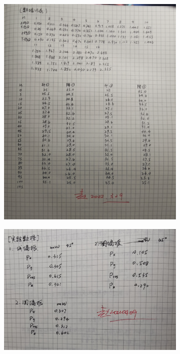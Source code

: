 \documentclass[10pt,a4paper,twoside,UTF8]{ctexart}
\begin{document}
\begin{figure}[htbp]
	\centering
	\includegraphics[width=0.8\textwidth]{img//sig_3.jpg}
	\label{fig:sig_3}
\end{figure}

\begin{figure}[htbp]
	\centering
	\includegraphics[width=0.8\textwidth]{img//sig_4.jpg}
	\label{fig:sig_4}
\end{figure}
\end{document}

